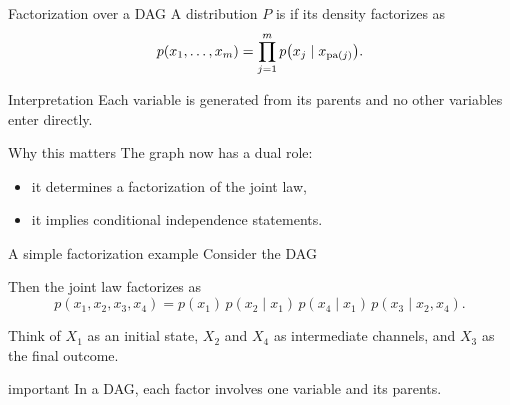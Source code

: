 \documentclass[dvipsnames,aspectratio=169,handout]{beamer}
\begin{document}
\begin{frame}{Factorization over a DAG}
A distribution $P$ is  if its density factorizes as
\[
p(x_1,\ldots,x_m)=\prod_{j=1}^m p\bigl(x_j\mid x_{\operatorname{pa}(j)}\bigr).
\]

\begin{block}{Interpretation}
Each variable is generated from its parents and no other variables enter directly.
\end{block}

\begin{alertblock}{Why this matters}
The graph now has a dual role:
\begin{itemize}
    \item it determines a factorization of the joint law,
    \item it implies conditional independence statements.
\end{itemize}
\end{alertblock}
\end{frame}

\begin{frame}{A simple factorization example}
Consider the DAG

\begin{center}
\end{center}\vspace{-4mm}
Then the joint law factorizes as
\[
p(x_1,x_2,x_3,x_4)
=
p(x_1)\,p(x_2\mid x_1)\,p(x_4\mid x_1)\,p(x_3\mid x_2,x_4).
\]
\vspace{-7mm}
\begin{block}{}
Think of $X_1$ as an initial state, $X_2$ and $X_4$ as intermediate channels,
and $X_3$ as the final outcome.
\end{block}

\begin{beamercolorbox}[wd=\textwidth,sep=7pt,center,rounded=true,shadow=true]{important}
In a DAG, each factor involves one variable and its parents.
\end{beamercolorbox}
\end{frame}
\end{document}
